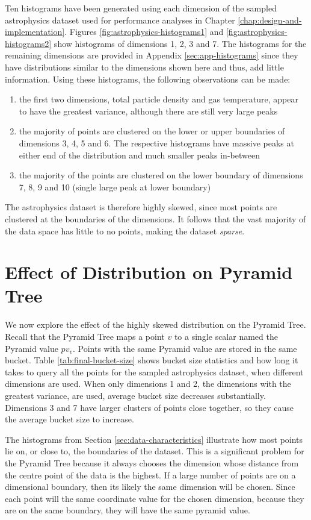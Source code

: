 Ten histograms have been generated using each dimension of the sampled astrophysics dataset used for performance analyses in Chapter \ref{chap:design-and-implementation}. Figures \ref{fig:astrophysics-histograms1} and \ref{fig:astrophysics-histograms2} show histograms of dimensions 1, 2, 3 and 7. The histograms for the remaining dimensions are provided in Appendix \ref{sec:app-histograms} since they have distributions similar to the dimensions shown here and thus, add little information. Using these histograms, the following observations can be made:
\begin{enumerate}
	\item the first two dimensions, total particle density and gas temperature, appear to have the greatest variance, although there are still very large peaks
	\item the majority of points are clustered on the lower or upper boundaries of dimensions 3, 4, 5 and 6. The respective histograms have massive peaks at either end of the distribution and much smaller peaks in-between
	\item the majority of the points are clustered on the lower boundary of dimensions 7, 8, 9 and 10 (single large peak at lower boundary)
\end{enumerate}
The astrophysics dataset is therefore highly skewed, since most points are clustered at the boundaries of the dimensions. It follows that the vast majority of the data space has little to no points, making the dataset \textit{sparse}.

\section{Effect of Distribution on Pyramid Tree}

We now explore the effect of the highly skewed distribution on the Pyramid Tree. Recall that the Pyramid Tree maps a point $v$ to a single scalar named the Pyramid value $pv_v$. Points with the same Pyramid value are stored in the same bucket. Table \ref{tab:final-bucket-size} shows bucket size statistics and how long it takes to query all the points for the sampled astrophysics dataset, when different dimensions are used. When only dimensions 1 and 2, the dimensions with the greatest variance, are used, average bucket size decreases substantially. Dimensions 3 and 7 have larger clusters of points close together, so they cause the average bucket size to increase.

The histograms from Section \ref{sec:data-characteristics} illustrate how most points lie on, or close to, the boundaries of the dataset. This is a significant problem for the Pyramid Tree because it always chooses the dimension whose distance from the centre point of the data is the highest. If a large number of points are on a dimensional boundary, then its likely the same dimension will be chosen. Since each point will the same coordinate value for the chosen dimension, because they are on the same boundary, they will have the same pyramid value.

